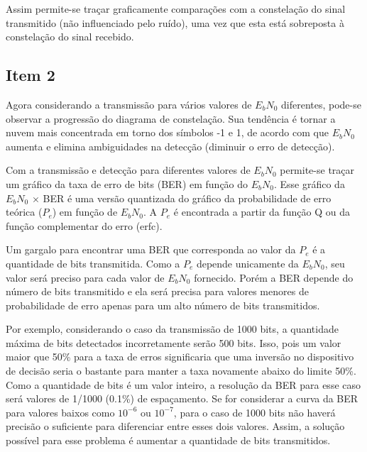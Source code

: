 Assim permite-se traçar graficamente comparações com a constelação do sinal transmitido (não influenciado pelo ruído), uma vez que esta está sobreposta à constelação do sinal recebido.

\subsection*{Item 2}

Agora considerando a transmissão para vários valores de $E_bN_0$ diferentes, pode-se observar a progressão do diagrama de constelação. Sua tendência é tornar a nuvem mais concentrada em torno dos símbolos -1 e 1, de acordo com que $E_bN_0$ aumenta e elimina ambiguidades na detecção (diminuir o erro de detecção).

Com a transmissão e detecção para diferentes valores de $E_bN_0$ permite-se traçar um gráfico da taxa de erro de bits (BER) em função do $E_bN_0$. Esse gráfico da $E_bN_0$ $\times$ BER é uma versão quantizada do gráfico da probabilidade de erro teórica ($P_e$) em função de $E_bN_0$. A $P_e$ é encontrada a partir da função Q ou da função complementar do erro (erfc).

Um gargalo para encontrar uma BER que corresponda ao valor da $P_e$ é a quantidade de bits transmitida. Como a $P_e$ depende unicamente da $E_bN_0$, seu valor será preciso para cada valor de $E_bN_0$ fornecido. Porém a BER depende do número de bits transmitido e ela será precisa para valores menores de probabilidade de erro apenas para um alto número de bits transmitidos.

Por exemplo, considerando o caso da transmissão de 1000 bits, a quantidade máxima de bits detectados incorretamente serão 500 bits. Isso, pois um valor maior que 50\% para a taxa de erros significaria que uma inversão no dispositivo de decisão seria o bastante para manter a taxa novamente abaixo do limite 50\%. Como a quantidade de bits é um valor inteiro, a resolução da BER para esse caso será valores de 1/1000 (0.1\%) de espaçamento. Se for considerar a curva da BER para valores baixos como $10^{-6}$ ou $10^{-7}$, para o caso de 1000 bits não haverá precisão o suficiente para diferenciar entre esses dois valores. Assim, a solução possível para esse problema é aumentar a quantidade de bits transmitidos.

